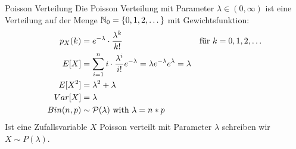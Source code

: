 \begin{definition}{Poisson Verteilung}
  Die Poisson Verteilung mit Parameter $\lambda \in (0, \infty)$ ist eine
Verteilung auf der Menge $\mathbb{N}_0 = \{0, 1, 2, \dots\}$ mit Gewichtsfunktion:
\begin{align*}
  p_X (k) & = e^{-\lambda} \cdot \frac{\lambda^k}{k!}
          &                                                                                            & \text{für } k = 0, 1, 2, \dots \\
  E[X]    & = \sum_{i = 1}^n i \cdot \frac{\lambda^i}{i!} e^{-\lambda} = \lambda e^{-\lambda} e^\lambda = \lambda                                  \\
  E[X^2]  & = \lambda^2 + \lambda                                                                                                       \\
  Var[X]  & = \lambda \\
  Bin(n, p) & \sim \mathcal{P}(\lambda) \text{ with } \lambda = n * p
\end{align*}
Ist eine Zufallsvariable $X$ Poisson verteilt mit Parameter $\lambda$
schreiben wir $X \sim P (\lambda)$.
\end{definition}
